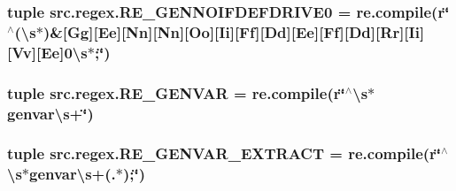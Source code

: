 \hypertarget{namespacesrc_1_1regex_aa7071c39ab8d20e39438b20e70ea5314}{
\subsubsection[{R\-E\-\_\-\-G\-E\-N\-N\-O\-I\-F\-D\-E\-F\-D\-R\-I\-V\-E0}]{\setlength{\rightskip}{0pt plus 5cm}tuple src.\-regex.\-R\-E\-\_\-\-G\-E\-N\-N\-O\-I\-F\-D\-E\-F\-D\-R\-I\-V\-E0 = re.\-compile(r\char`\"{}$^\wedge$(\textbackslash{}s$\ast$)\&\mbox{[}Gg\mbox{]}\mbox{[}Ee\mbox{]}\mbox{[}Nn\mbox{]}\mbox{[}Nn\mbox{]}\mbox{[}Oo\mbox{]}\mbox{[}Ii\mbox{]}\mbox{[}Ff\mbox{]}\mbox{[}Dd\mbox{]}\mbox{[}Ee\mbox{]}\mbox{[}Ff\mbox{]}\mbox{[}Dd\mbox{]}\mbox{[}Rr\mbox{]}\mbox{[}Ii\mbox{]}\mbox{[}Vv\mbox{]}\mbox{[}Ee\mbox{]}0\textbackslash{}s$\ast$;\char`\"{})}}\label{namespacesrc_1_1regex_aa7071c39ab8d20e39438b20e70ea5314}
\hypertarget{namespacesrc_1_1regex_a91ffc13827ce161b947038e052906c75}{
\subsubsection[{R\-E\-\_\-\-G\-E\-N\-V\-A\-R}]{\setlength{\rightskip}{0pt plus 5cm}tuple src.\-regex.\-R\-E\-\_\-\-G\-E\-N\-V\-A\-R = re.\-compile(r\char`\"{}$^\wedge$\textbackslash{}s$\ast$genvar\textbackslash{}s+\char`\"{})}}\label{namespacesrc_1_1regex_a91ffc13827ce161b947038e052906c75}
\hypertarget{namespacesrc_1_1regex_a60335fe5825b519aff08991a2c96c757}{
\subsubsection[{R\-E\-\_\-\-G\-E\-N\-V\-A\-R\-\_\-\-E\-X\-T\-R\-A\-C\-T}]{\setlength{\rightskip}{0pt plus 5cm}tuple src.\-regex.\-R\-E\-\_\-\-G\-E\-N\-V\-A\-R\-\_\-\-E\-X\-T\-R\-A\-C\-T = re.\-compile(r\char`\"{}$^\wedge$\textbackslash{}s$\ast$genvar\textbackslash{}s+(.$\ast$);\char`\"{})}}\label{namespacesrc_1_1regex_a60335fe5825b519aff08991a2c96c757}
